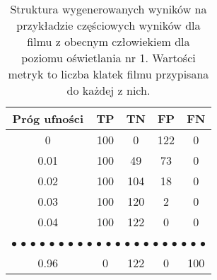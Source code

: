 \begin{table}[H]
    \centering
    \caption{Struktura wygenerowanych wyników na przykładzie częściowych wyników dla filmu z obecnym człowiekiem dla poziomu oświetlania nr 1. Wartości metryk to liczba klatek filmu przypisana do każdej z nich.}
    \begin{tabular}{ccccc}
    \hline
    \multicolumn{1}{|c|}{Próg ufności} & \multicolumn{1}{c|}{TP}                    & \multicolumn{1}{c|}{TN}                    & \multicolumn{1}{c|}{FP}                    & \multicolumn{1}{c|}{FN}                    \\ \hline
    \multicolumn{1}{|c|}{0}                                 & \multicolumn{1}{c|}{100}                   & \multicolumn{1}{c|}{0}                     & \multicolumn{1}{c|}{122}                   & \multicolumn{1}{c|}{0}                     \\ \hline
    \multicolumn{1}{|c|}{0.01}                              & \multicolumn{1}{c|}{100}                   & \multicolumn{1}{c|}{49}                    & \multicolumn{1}{c|}{73}                    & \multicolumn{1}{c|}{0}                     \\ \hline
    \multicolumn{1}{|c|}{0.02}                              & \multicolumn{1}{c|}{100}                   & \multicolumn{1}{c|}{104}                   & \multicolumn{1}{c|}{18}                    & \multicolumn{1}{c|}{0}                     \\ \hline
    \multicolumn{1}{|c|}{0.03}                              & \multicolumn{1}{c|}{100}                   & \multicolumn{1}{c|}{120}                   & \multicolumn{1}{c|}{2}                     & \multicolumn{1}{c|}{0}                     \\ \hline
    \multicolumn{1}{|c|}{0.04}                              & \multicolumn{1}{c|}{100}                   & \multicolumn{1}{c|}{122}                   & \multicolumn{1}{c|}{0}                     & \multicolumn{1}{c|}{0}                     \\ \hline
    \multicolumn{5}{c}{$\bullet$ $\bullet$   $\bullet$ $\bullet$ $\bullet$ $\bullet$ $\bullet$ $\bullet$ $\bullet$   $\bullet$ $\bullet$ $\bullet$ $\bullet$ $\bullet$ $\bullet$ $\bullet$   $\bullet$ $\bullet$ $\bullet$ $\bullet$ $\bullet$} \\ \hline
    \multicolumn{1}{|c|}{0.96}                              & \multicolumn{1}{c|}{0}                     & \multicolumn{1}{c|}{122}                   & \multicolumn{1}{c|}{0}                     & \multicolumn{1}{c|}{100}                   \\ \hline

\end{tabular}
\end{table}
